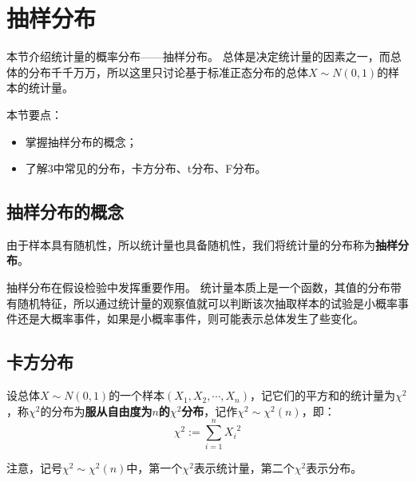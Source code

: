 \section{抽样分布}

本节介绍统计量的概率分布——抽样分布。
总体是决定统计量的因素之一，而总体的分布千千万万，所以这里只讨论基于标准正态分布的总体$X\sim N\left( 0,1 \right) $的样本的统计量。

本节要点：
\begin{itemize}
    \item 掌握抽样分布的概念；
    \item 了解3中常见的分布，卡方分布、t分布、F分布。
\end{itemize}

\subsection{抽样分布的概念}

\begin{definition}[抽样分布]
由于样本具有随机性，所以统计量也具备随机性，我们将统计量的分布称为{\bf 抽样分布}。
\end{definition}

抽样分布在假设检验中发挥重要作用。
统计量本质上是一个函数，其值的分布带有随机特征，所以通过统计量的观察值就可以判断该次抽取样本的试验是小概率事件还是大概率事件，如果是小概率事件，则可能表示总体发生了些变化。

\subsection{卡方分布}

\begin{definition}[卡方分布]
设总体$X\sim N\left( 0,1 \right) $的一个样本$\left( X_1,X_2,\cdots ,X_n \right) $，记它们的平方和的统计量为$\chi ^2$，称$\chi ^2$的分布为{\bf 服从自由度为$n$的$\chi ^2$分布}，记作$\chi ^2\sim \chi ^2\left( n \right) $，即：
\[
\chi ^2:=\sum_{i=1}^n{{X_i}^2}
\]
\end{definition}

\begin{tcolorbox}
注意，记号$\chi ^2\sim \chi ^2\left( n \right) $中，第一个$\chi ^2$表示统计量，第二个$\chi ^2$表示分布。
\end{tcolorbox}

